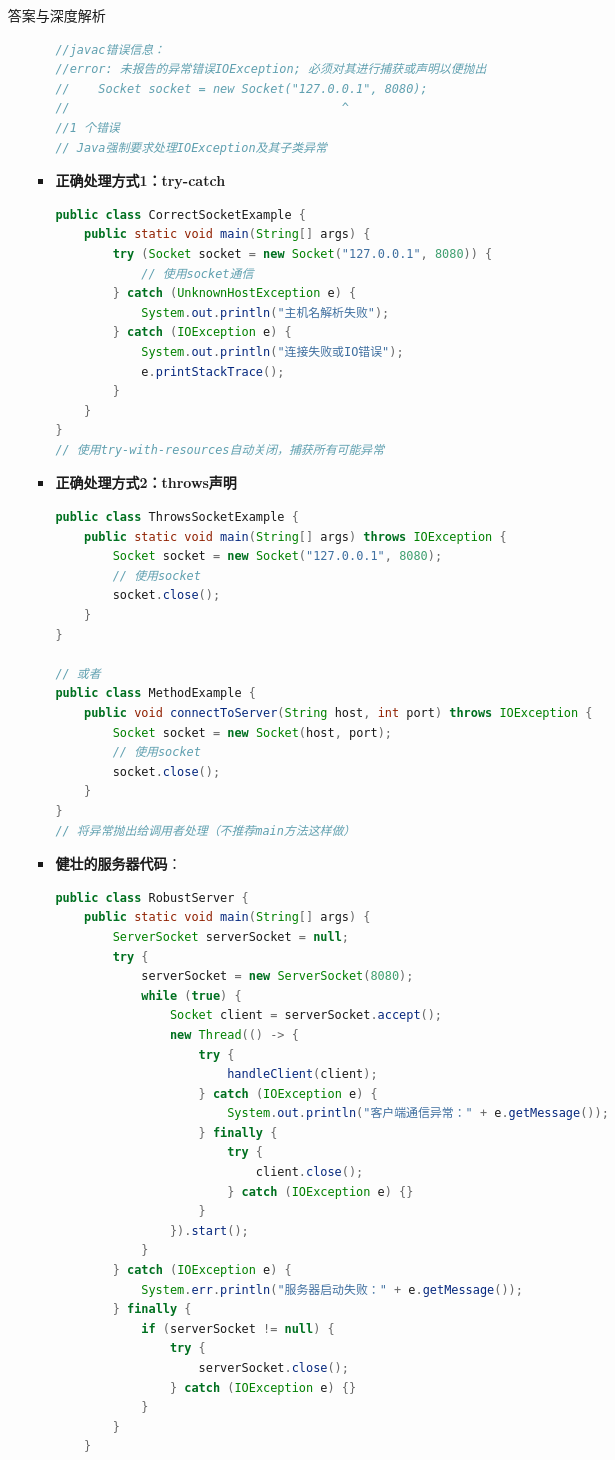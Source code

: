 \documentclass[12pt, a4paper]{ctexart}
\begin{document}
\begin{enumerate}[label=\textbf{\arabic*.}]
\begin{bluebox}{答案与深度解析}
\begin{itemize}[leftmargin=*, nosep, label={}]
\begin{itemize}[label={}, leftmargin=*, nosep]
\begin{lstlisting}[language=Java]
//javac错误信息：
//error: 未报告的异常错误IOException; 必须对其进行捕获或声明以便抛出
//    Socket socket = new Socket("127.0.0.1", 8080);
//                                      ^
//1 个错误
// Java强制要求处理IOException及其子类异常
					      \end{lstlisting}
				            \item \textbf{正确处理方式1：try-catch}
				                  \begin{lstlisting}[language=Java]
public class CorrectSocketExample {
    public static void main(String[] args) {
        try (Socket socket = new Socket("127.0.0.1", 8080)) {
            // 使用socket通信
        } catch (UnknownHostException e) {
            System.out.println("主机名解析失败");
        } catch (IOException e) {
            System.out.println("连接失败或IO错误");
            e.printStackTrace();
        }
    }
}
// 使用try-with-resources自动关闭，捕获所有可能异常
					      \end{lstlisting}
				            \item \textbf{正确处理方式2：throws声明}
				                  \begin{lstlisting}[language=Java]
public class ThrowsSocketExample {
    public static void main(String[] args) throws IOException {
        Socket socket = new Socket("127.0.0.1", 8080);
        // 使用socket
        socket.close();
    }
}

// 或者
public class MethodExample {
    public void connectToServer(String host, int port) throws IOException {
        Socket socket = new Socket(host, port);
        // 使用socket
        socket.close();
    }
}
// 将异常抛出给调用者处理（不推荐main方法这样做）
					      \end{lstlisting}
				            \item \textbf{健壮的服务器代码}：
				                  \begin{lstlisting}[language=Java]
public class RobustServer {
    public static void main(String[] args) {
        ServerSocket serverSocket = null;
        try {
            serverSocket = new ServerSocket(8080);
            while (true) {
                Socket client = serverSocket.accept();
                new Thread(() -> {
                    try {
                        handleClient(client);
                    } catch (IOException e) {
                        System.out.println("客户端通信异常：" + e.getMessage());
                    } finally {
                        try {
                            client.close();
                        } catch (IOException e) {}
                    }
                }).start();
            }
        } catch (IOException e) {
            System.err.println("服务器启动失败：" + e.getMessage());
        } finally {
            if (serverSocket != null) {
                try {
                    serverSocket.close();
                } catch (IOException e) {}
            }
        }
    }


\end{lstlisting}
\end{itemize}
\end{itemize}
\end{bluebox}
\end{enumerate}
\end{document}
